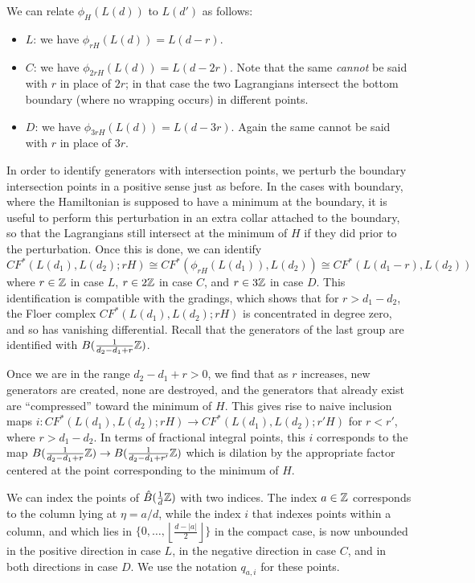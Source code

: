 \documentclass[12pt]{amsart}
\begin{document}
We can relate $\phi_H(L(d))$ to $L(d')$ as follows:
\begin{itemize}
\item $L$: we have $\phi_{rH}(L(d)) = L(d-r)$.
\item $C$: we have $\phi_{2rH}(L(d)) = L(d-2r)$. Note that the same
  \emph{cannot} be said with $r$ in place of $2r$; in that case the
  two Lagrangians intersect the bottom boundary (where no wrapping
  occurs) in different points.
\item $D$: we have $\phi_{3rH}(L(d)) = L(d-3r)$. Again the same cannot
  be said with $r$ in place of $3r$.
\end{itemize}

In order to identify generators with intersection points, we perturb
the boundary intersection points in a positive sense just as before. 
In the cases with boundary, where the Hamiltonian is supposed to
have a minimum at the boundary, it is useful to perform this
perturbation in an extra collar attached to the boundary, so that the
Lagrangians still intersect at the minimum of $H$ if they did prior to
the perturbation. Once this is done, we can identify
\begin{equation}
  CF^*(L(d_1),L(d_2);rH) \cong CF^*(\phi_{rH}(L(d_1)),L(d_2)) \cong CF^*(L(d_1-r),L(d_2))
\end{equation}
where $r\in \mathbb{Z}$ in case $L$, $r\in 2\mathbb{Z}$ in case $C$, and $r\in 3\mathbb{Z}$
in case $D$. This identification is compatible with the gradings, which shows that for $r > d_1 - d_2$, the Floer complex $CF^*(L(d_1),L(d_2);rH)$ is concentrated in degree zero, and so has vanishing differential. Recall that the generators of the last group are
identified with $B(\frac{1}{d_2-d_1+r}\mathbb{Z})$.

Once we are in the range $d_2-d_1 + r > 0$, we find that as $r$
increases, new generators are created, none are destroyed, and the
generators that already exist are ``compressed'' toward the minimum of
$H$. This gives rise to naive inclusion maps $i :
CF^*(L(d_1),L(d_2);rH) \to CF^*(L(d_1),L(d_2);r'H)$ for $r < r'$,
where $r > d_1-d_2$. In terms of fractional integral points, this $i$
corresponds to the map $B(\frac{1}{d_2-d_1+r}\mathbb{Z}) \to
B(\frac{1}{d_2-d_1+r'}\mathbb{Z})$ which is dilation by the appropriate factor
centered at the point corresponding to the minimum of $H$.

We can index the points of $\hat{B}(\frac{1}{d}\mathbb{Z})$ with two
indices. The index $a\in \mathbb{Z}$ corresponds to the column lying at $\eta
= a/d$, while the index $i$ that indexes points within a column, and
which lies in $\{0,\dots,\left\lfloor\frac{d-|a|}{2}\right\rfloor\}$
in the compact case, is now unbounded in the positive direction in
case $L$, in the negative direction in case $C$, and in both
directions in case $D$. We use the notation $q_{a,i}$ for these
points.
\end{document}
